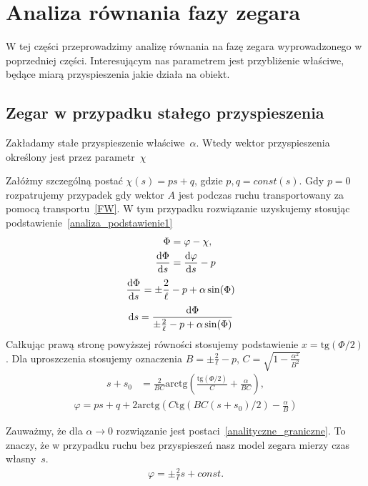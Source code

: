 \newpage
\section{Analiza równania fazy zegara}
W tej części przeprowadzimy analizę równania na fazę zegara
wyprowadzonego w poprzedniej części.
Interesującym nas parametrem jest przybliżenie właściwe, będące miarą 
przyspieszenia jakie działa na obiekt. 

\subsection{Zegar w przypadku stałego przyspieszenia}
Zakładamy stałe przyspieszenie właściwe~$\alpha$. Wtedy wektor 
przyspieszenia określony jest przez parametr~$\chi$

Załóżmy szczególną postać $\chi (s) = p s + q$, 
gdzie $p,q = const(s)$.  Gdy $p=0$ 
rozpatrujemy przypadek gdy wektor $A$ jest podczas ruchu
transportowany za pomocą transportu~\eqref{FW}.  
W tym przypadku rozwiązanie uzyskujemy stosując  
podstawienie~\eqref{analiza_podstawienie1}
\begin{align} \label{analiza_podstawienie1}
\Phi &= \varphi - \chi,\\
\frac{\text{d} \Phi}{\text{d} s} &= \frac{\text{d} \varphi }{\text{d} s} - p
\end{align}
\begin{align*}
\frac{\text{d} \Phi}{\text{d} s} &= \pm \frac{2}{\ell} - p  + 
\alpha \sin (\Phi ) 
\end{align*}
\begin{align*}
\text{d} s & = \frac{\text{d} \Phi}{ \pm \frac{2}{\ell} - p  + 
\alpha \sin (\Phi ) }
\end{align*}
Całkując prawą stronę powyższej równości stosujemy podstawienie
 $ x = \text{tg} (\Phi/2)$. Dla uproszczenia stosujemy oznaczenia
$B = \pm \frac{2}{\ell} - p $,
$C =  \sqrt{ 1 - \frac{\alpha^2}{B^2}}$
\begin{align*}
s +s_0 & = \frac{2}{BC} \text{arctg}  
\left( \frac{ \text{tg} (\Phi/2)}{C} +\frac{\alpha}{BC} \right),
\end{align*}
\begin{align*}
\varphi = ps + q + 
2\text{arctg} \left( 
C \text{tg} \left( BC(s + s_0)/2\right)  - \frac{\alpha}{B}
\right)
\end{align*}

Zauważmy, że dla $\alpha \to 0$ rozwiązanie jest 
postaci~\eqref{analityczne_graniczne}. To znaczy, że w przypadku ruchu
bez przyspieszeń nasz model zegara mierzy czas własny~$s$.
\begin{align}\label{analityczne_graniczne}
\varphi = \pm \frac{2}{\ell} s + const.
\end{align}

